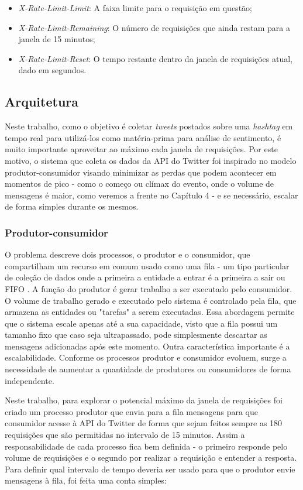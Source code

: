 \begin{itemize}
	\item \textit{X-Rate-Limit-Limit}: A faixa limite para o requisição em questão;
	\item \textit{X-Rate-Limit-Remaining}: O número de requisições que ainda restam para a janela de 15 minutos;
	\item \textit{X-Rate-Limit-Reset}: O tempo restante dentro da janela de requisições atual, dado em segundos.
\end{itemize}

\subsection{Arquitetura}

Neste trabalho, como o objetivo é coletar \textit{tweets} postados sobre uma \textit{hashtag} em tempo real para utilizá-los como matéria-prima para análise de sentimento, é muito importante aproveitar ao máximo cada janela de requisições. Por este motivo, o sistema que coleta os dados da API do Twitter foi inspirado no modelo produtor-consumidor\cite{jeffay1993real} visando minimizar as perdas que podem acontecer em momentos de pico - como o começo ou clímax do evento, onde o volume de mensagens é maior, como veremos a frente no Capítulo 4 - e se necessário, escalar de forma simples durante os mesmos. 

\subsubsection{Produtor-consumidor}

O problema descreve dois processos, o produtor e o consumidor, que compartilham um recurso em comum usado como uma fila - um tipo particular de coleção de dados onde a primeira a entidade a entrar é a primeira a sair ou \ac{FIFO} . A função do produtor é gerar trabalho a ser executado pelo consumidor. O volume de trabalho gerado e executado pelo sistema é controlado pela fila, que armazena as entidades ou "tarefas" a serem executadas. Essa abordagem permite que o sistema escale apenas até a sua capacidade, visto que a fila possui um tamanho fixo que caso seja ultrapassado, pode simplesmente descartar as mensagens adicionadas após este momento. Outra característica importante é a escalabilidade. Conforme os processos produtor e consumidor evoluem, surge a necessidade de aumentar a quantidade de produtores ou consumidores de forma independente.

Neste trabalho, para explorar o potencial máximo da janela de requisições foi criado um processo produtor que envia para a fila mensagens para que consumidor acesse à API do Twitter de forma que sejam feitos sempre as 180 requisições que são permitidas no intervalo de 15 minutos. Assim a responsabilidade de cada processo fica bem definida - o primeiro responde pelo volume de requisições e o segundo por realizar a requisição e entender a resposta. Para definir qual intervalo de tempo deveria ser usado para que o produtor envie mensagens à fila, foi feita uma conta simples:

